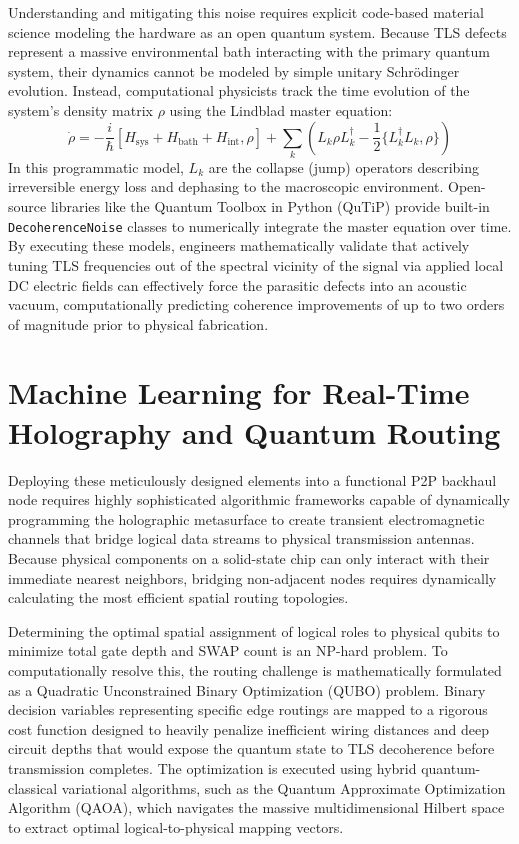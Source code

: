 \documentclass[11pt,a4paper]{article}
\begin{document}
Understanding and mitigating this noise requires explicit code-based material science modeling the hardware as an open quantum system.\cite{ref6} Because TLS defects represent a massive environmental bath interacting with the primary quantum system, their dynamics cannot be modeled by simple unitary Schrödinger evolution.\cite{ref6} Instead, computational physicists track the time evolution of the system's density matrix $\rho$ using the Lindblad master equation:
\begin{equation}
\dot{\rho} = -\frac{i}{\hbar}[H_{\text{sys}} + H_{\text{bath}} + H_{\text{int}}, \rho] + \sum_k \left( L_k \rho L_k^\dagger - \frac{1}{2}\{L_k^\dagger L_k, \rho\} \right)
\end{equation}
In this programmatic model, $L_k$ are the collapse (jump) operators describing irreversible energy loss and dephasing to the macroscopic environment.\cite{ref6} Open-source libraries like the Quantum Toolbox in Python (QuTiP) provide built-in \texttt{DecoherenceNoise} classes to numerically integrate the master equation over time.\cite{ref6} By executing these models, engineers mathematically validate that actively tuning TLS frequencies out of the spectral vicinity of the signal via applied local DC electric fields can effectively force the parasitic defects into an acoustic vacuum, computationally predicting coherence improvements of up to two orders of magnitude prior to physical fabrication.\cite{ref6}

\section{Machine Learning for Real-Time Holography and Quantum Routing}

Deploying these meticulously designed elements into a functional P2P backhaul node requires highly sophisticated algorithmic frameworks capable of dynamically programming the holographic metasurface to create transient electromagnetic channels that bridge logical data streams to physical transmission antennas.\cite{ref6} Because physical components on a solid-state chip can only interact with their immediate nearest neighbors, bridging non-adjacent nodes requires dynamically calculating the most efficient spatial routing topologies.

Determining the optimal spatial assignment of logical roles to physical qubits to minimize total gate depth and SWAP count is an NP-hard problem.\cite{ref6} To computationally resolve this, the routing challenge is mathematically formulated as a Quadratic Unconstrained Binary Optimization (QUBO) problem.\cite{ref6} Binary decision variables representing specific edge routings are mapped to a rigorous cost function designed to heavily penalize inefficient wiring distances and deep circuit depths that would expose the quantum state to TLS decoherence before transmission completes.\cite{ref6} The optimization is executed using hybrid quantum-classical variational algorithms, such as the Quantum Approximate Optimization Algorithm (QAOA), which navigates the massive multidimensional Hilbert space to extract optimal logical-to-physical mapping vectors.\cite{ref6}
\end{document}
